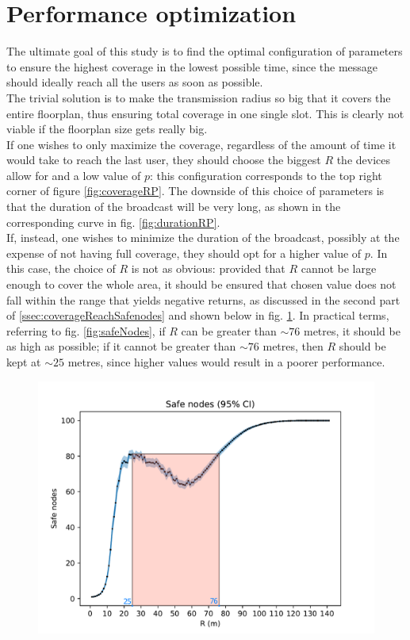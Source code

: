 \section{Performance optimization}
The ultimate goal of this study is to find the optimal configuration of parameters to ensure the highest coverage in the lowest possible time, since the message should ideally reach all the users as soon as possible.\\
The trivial solution is to make the transmission radius so big that it covers the entire floorplan, thus ensuring total coverage in one single slot.
This is clearly not viable if the floorplan size gets really big.\\
If one wishes to only maximize the coverage, regardless of the amount of time it would take to reach the last user, they should choose the biggest $R$ the devices allow for and a low value of $p$: this configuration corresponds to the top right corner of figure \ref{fig:coverageRP}. The downside of this choice of parameters is that the duration of the broadcast will be very long, as shown in the corresponding curve in fig. \ref{fig:durationRP}.\\
If, instead, one wishes to minimize the duration of the broadcast, possibly at the expense of not having full coverage, they should opt for a higher value of $p$. In this case, the choice of $R$ is not as obvious: provided that $R$ cannot be large enough to cover the whole area, it should be ensured that chosen value does not fall within the range that yields negative returns, as discussed in the second part of \ref{ssec:coverageReachSafenodes} and shown below in fig. \ref{fig:safeNodesShaded}. In practical terms, referring to fig. \ref{fig:safeNodes}, if $R$ can be greater than $\sim76$ metres, it should be as high as possible; if it cannot be greater than $\sim76$ metres, then $R$ should be kept at $\sim25$ metres, since higher values would result in a poorer performance.

\begin{figure}[H]
    \begin{center}
        \includegraphics[scale=0.7]{img/graphAnalysisSafe_nodesRed.png}
        \caption{}
        \label{fig:safeNodesShaded}
    \end{center}
    \vspace*{-0.8cm}
\end{figure}
